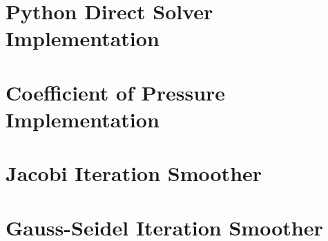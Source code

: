 \pagebreak
\addappheadtotoc
\begin{appendices}
    \appendixpage


    \section{Python Direct Solver Implementation}
    

    \pagebreak
    \section{Coefficient of Pressure Implementation}
    

    \pagebreak
    \section{Jacobi Iteration Smoother}
    

    \pagebreak
    \section{Gauss-Seidel Iteration Smoother}
    


\end{appendices}

